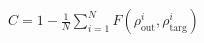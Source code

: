 \documentclass[preview]{standalone}
\begin{document}
\begin{align*}
C = 1 - \frac{1}{N} \sum_{i=1}^N F(\rho^i_{\text{out}}, \rho^i_{\text{targ}})
\end{align*}
\end{document}
